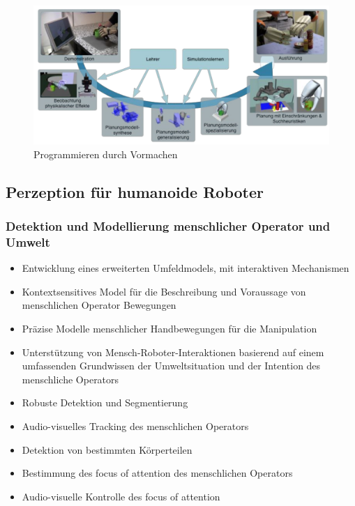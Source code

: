 \begin{figure}[h!]
	\centering
	\includegraphics[width=.8\textwidth]{figures/pdv.png}
	\caption{Programmieren durch Vormachen}
\end{figure}
\newpage
\subsection{Perzeption für humanoide Roboter}
\subsubsection{Detektion und Modellierung menschlicher Operator und Umwelt}
\begin{itemize}
	\item Entwicklung eines erweiterten Umfeldmodels, mit interaktiven Mechanismen
	\item Kontextsensitives Model für die Beschreibung und Voraussage von menschlichen Operator Bewegungen
	\item Präzise Modelle menschlicher Handbewegungen für die Manipulation
	\item Unterstützung von Mensch-Roboter-Interaktionen basierend auf einem umfassenden Grundwissen der Umweltsituation und der Intention des menschliche Operators
	\item Robuste Detektion und Segmentierung
	\item Audio-visuelles Tracking des menschlichen Operators
	\item Detektion von bestimmten Körperteilen
	\item Bestimmung des \glqq focus of attention\grqq{} des menschlichen Operators
	\item Audio-visuelle Kontrolle des \glqq focus of attention\grqq
\end{itemize}

